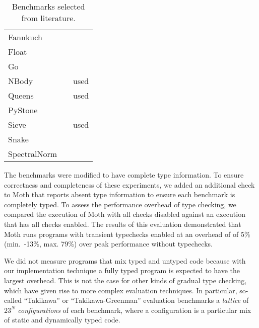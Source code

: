 \documentclass[sigplan,10pt,review,screen]{acmart}\settopmatter{printfolios=true}
\begin{document}
\begin{table}[htb]
  \caption{Benchmarks selected from literature.}
  \label{tab:gradual-benchmarks}
  \begin{center}
    \begin{tabular}{l l r}
      Fannkuch & \cite{Vitousek2017,Greenman2018} \\
      Float & \cite{Vitousek2017,Muehlboeck2017,Greenman2018} \\
      Go & \cite{Vitousek2017,Muehlboeck2017,Greenman2018} \\
      NBody & \cite{Kuhlenschmidt:2018:preprint,Vitousek2017,Greenman2018} & used \cite{Marr2016} \\
      Queens & \cite{Vitousek2017,Muehlboeck2017,Greenman2018} & used \cite{Marr2016} \\
      PyStone & \cite{Vitousek2017,Muehlboeck2017,Greenman2018} \\
      Sieve & \cite{Takikawa2016,Muehlboeck2017,Bauman2017,Richards2017,Greenman2019jfp} & used \cite{Marr2016} \\
      Snake & \cite{Takikawa2016,Muehlboeck2017,Bauman2017,Richards2017,Greenman2019jfp} \\
      SpectralNorm & \cite{Vitousek2017,Muehlboeck2017,Greenman2018} \\
    \end{tabular}
  \end{center}
\end{table}

The benchmarks were modified to have complete type information.  To
ensure correctness and completeness of these experiments, we added an
additional check to Moth that reports absent type information to
ensure each benchmark is completely typed.  To assess the performance
overhead of type checking, we compared the execution of Moth with all
checks disabled against an execution that has all checks enabled.  The
results of this evaluation demonstrated that Moth runs programs with
transient typechecks enabled at an overhead of of 5\% (min.\ -13\%,
max. 79\%) over peak performance without typechecks.

We did not measure programs that mix typed and untyped code because
with our implementation technique a fully typed program is expected to
have the largest overhead. This is not the case for other kinds of
gradual type checking, which have given rise to more complex
evaluation techniques.  In particular, so-called ``Takikawa'' or
``Takikawa-Greenman'' evaluation \cite{Takikawa2016,Greenman2019jfp}
benchmarks a \emph{lattice} of $23^N$ \emph{configurations} of each
benchmark, where a configuration is a particular mix of static and
dynamically typed code.
\end{document}

